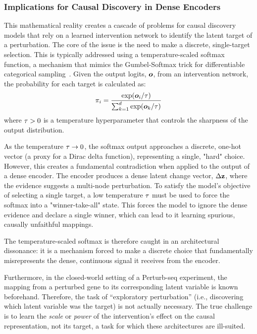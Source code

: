 \subsubsection{Implications for Causal Discovery in Dense Encoders}
\label{app:proofs:spillover:implications}

This mathematical reality creates a cascade of problems for causal discovery models that rely on a learned intervention network to identify the latent target of a perturbation.
The core of the issue is the need to make a discrete, single-target selection.
This is typically addressed using a temperature-scaled softmax function, a mechanism that mimics the Gumbel-Softmax trick for differentiable categorical sampling~\citep{jang2016categorical}.
Given the output logits, ${\bm{o}}$, from an intervention network, the probability for each target is calculated as:
\begin{equation}
\pi_i = \frac{\exp({\bm{o}}_i / \tau)}{\sum_{k=1}^{d} \exp({\bm{o}}_k / \tau)}
\label{eq:app:temp_softmax}
\end{equation}
where $\tau > 0$ is a temperature hyperparameter that controls the sharpness of the output distribution.

As the temperature $\tau \to 0$, the softmax output approaches a discrete, one-hot vector (a proxy for a Dirac delta function), representing a single, "hard" choice.
However, this creates a fundamental contradiction when applied to the output of a dense encoder.
The encoder produces a dense latent change vector, $\Delta{\mathbf{z}}$, where the evidence suggests a multi-node perturbation.
To satisfy the model's objective of selecting a single target, a low temperature $\tau$ must be used to force the softmax into a "winner-take-all" state.
This forces the model to ignore the dense evidence and declare a single winner, which can lead to it learning spurious, causally unfaithful mappings.

The temperature-scaled softmax is therefore caught in an architectural dissonance: it is a mechanism forced to make a discrete choice that fundamentally misrepresents the dense, continuous signal it receives from the encoder.

Furthermore, in the closed-world setting of a Perturb-seq experiment, the mapping from a perturbed gene to its corresponding latent variable is known beforehand.
Therefore, the task of ``exploratory perturbation'' (i.e., discovering which latent variable was the target) is not actually necessary.
The true challenge is to learn the \emph{scale} or \emph{power} of the intervention's effect on the causal representation, not its target, a task for which these architectures are ill-suited.

